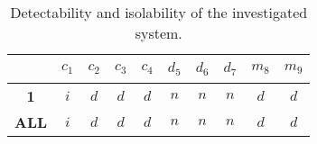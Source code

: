 \documentclass[a4,11pt]{article}
\begin{document}
\begin{table}[!htb]
\centering
\normalsize
\begin{tabular}{|c|c|c|c|c|c|c|c|c|c|}
\hline
~ & \textbf{$c_1$} & \textbf{$c_2$} & \textbf{$c_3$} & \textbf{$c_4$} & \textbf{$d_5$} & \textbf{$d_6$} & \textbf{$d_7$} & \textbf{$m_8$} & \textbf{$m_9$}\\ \hline 
\textbf{1} & $i$ & $d$ & $d$ & $d$ & $n$ & $n$ & $n$ & $d$ & $d$\\ \hline 
\textbf{ALL} & $i$ & $d$ & $d$ & $d$ & $n$ & $n$ & $n$ & $d$ & $d$\\ \hline 
\end{tabular}
\caption{Detectability and isolability of the investigated system.}
\label{tab:iso}
\end{table}
\end{document}
